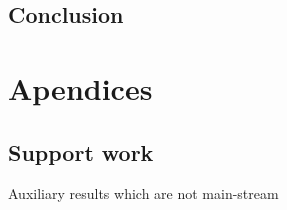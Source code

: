 \documentclass[
  oneside,
  11pt, a4paper,
  footinclude=true,
  headinclude=true,
  cleardoublepage=empty
]{scrbook}
\begin{document}
\chapter{Conclusion}
\label{chap:conclusion}


\cleardoublepage

%




\printindex
	
	\appendix
	\renewcommand\chaptername{Appendix}


\part{Apendices}

\chapter{Support work}
	Auxiliary results which are not main-stream
	
\end{document}
